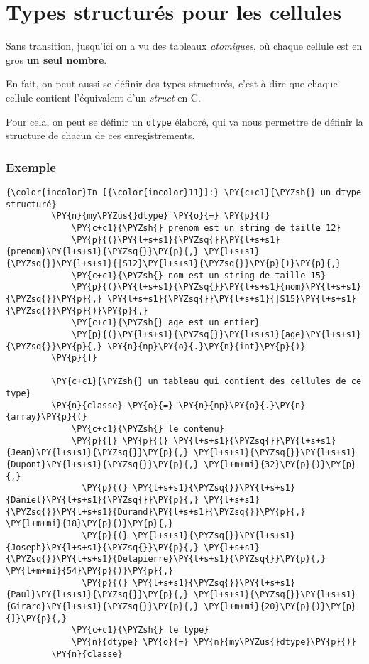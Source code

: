     \hypertarget{types-structuruxe9s-pour-les-cellules}{%
\section{Types structurés pour les
cellules}\label{types-structuruxe9s-pour-les-cellules}}

    Sans transition, jusqu'ici on a vu des tableaux \emph{atomiques}, où
chaque cellule est en gros \textbf{un seul nombre}.

En fait, on peut aussi se définir des types structurés, c'est-à-dire que
chaque cellule contient l'équivalent d'un \emph{struct} en C.

Pour cela, on peut se définir un \texttt{dtype} élaboré, qui va nous
permettre de définir la structure de chacun de ces enregistrements.

    \hypertarget{exemple}{%
\subsubsection{Exemple}\label{exemple}}

    \begin{Verbatim}[commandchars=\\\{\}]
{\color{incolor}In [{\color{incolor}11}]:} \PY{c+c1}{\PYZsh{} un dtype structuré}
         \PY{n}{my\PYZus{}dtype} \PY{o}{=} \PY{p}{[}
             \PY{c+c1}{\PYZsh{} prenom est un string de taille 12}
             \PY{p}{(}\PY{l+s+s1}{\PYZsq{}}\PY{l+s+s1}{prenom}\PY{l+s+s1}{\PYZsq{}}\PY{p}{,} \PY{l+s+s1}{\PYZsq{}}\PY{l+s+s1}{|S12}\PY{l+s+s1}{\PYZsq{}}\PY{p}{)}\PY{p}{,}
             \PY{c+c1}{\PYZsh{} nom est un string de taille 15}
             \PY{p}{(}\PY{l+s+s1}{\PYZsq{}}\PY{l+s+s1}{nom}\PY{l+s+s1}{\PYZsq{}}\PY{p}{,} \PY{l+s+s1}{\PYZsq{}}\PY{l+s+s1}{|S15}\PY{l+s+s1}{\PYZsq{}}\PY{p}{)}\PY{p}{,}
             \PY{c+c1}{\PYZsh{} age est un entier}
             \PY{p}{(}\PY{l+s+s1}{\PYZsq{}}\PY{l+s+s1}{age}\PY{l+s+s1}{\PYZsq{}}\PY{p}{,} \PY{n}{np}\PY{o}{.}\PY{n}{int}\PY{p}{)}
         \PY{p}{]}
         
         \PY{c+c1}{\PYZsh{} un tableau qui contient des cellules de ce type}
         \PY{n}{classe} \PY{o}{=} \PY{n}{np}\PY{o}{.}\PY{n}{array}\PY{p}{(}
             \PY{c+c1}{\PYZsh{} le contenu}
             \PY{p}{[} \PY{p}{(} \PY{l+s+s1}{\PYZsq{}}\PY{l+s+s1}{Jean}\PY{l+s+s1}{\PYZsq{}}\PY{p}{,} \PY{l+s+s1}{\PYZsq{}}\PY{l+s+s1}{Dupont}\PY{l+s+s1}{\PYZsq{}}\PY{p}{,} \PY{l+m+mi}{32}\PY{p}{)}\PY{p}{,}
               \PY{p}{(} \PY{l+s+s1}{\PYZsq{}}\PY{l+s+s1}{Daniel}\PY{l+s+s1}{\PYZsq{}}\PY{p}{,} \PY{l+s+s1}{\PYZsq{}}\PY{l+s+s1}{Durand}\PY{l+s+s1}{\PYZsq{}}\PY{p}{,} \PY{l+m+mi}{18}\PY{p}{)}\PY{p}{,}
               \PY{p}{(} \PY{l+s+s1}{\PYZsq{}}\PY{l+s+s1}{Joseph}\PY{l+s+s1}{\PYZsq{}}\PY{p}{,} \PY{l+s+s1}{\PYZsq{}}\PY{l+s+s1}{Delapierre}\PY{l+s+s1}{\PYZsq{}}\PY{p}{,} \PY{l+m+mi}{54}\PY{p}{)}\PY{p}{,}
               \PY{p}{(} \PY{l+s+s1}{\PYZsq{}}\PY{l+s+s1}{Paul}\PY{l+s+s1}{\PYZsq{}}\PY{p}{,} \PY{l+s+s1}{\PYZsq{}}\PY{l+s+s1}{Girard}\PY{l+s+s1}{\PYZsq{}}\PY{p}{,} \PY{l+m+mi}{20}\PY{p}{)}\PY{p}{]}\PY{p}{,}
             \PY{c+c1}{\PYZsh{} le type}
             \PY{n}{dtype} \PY{o}{=} \PY{n}{my\PYZus{}dtype}\PY{p}{)}
         \PY{n}{classe}
\end{Verbatim}


